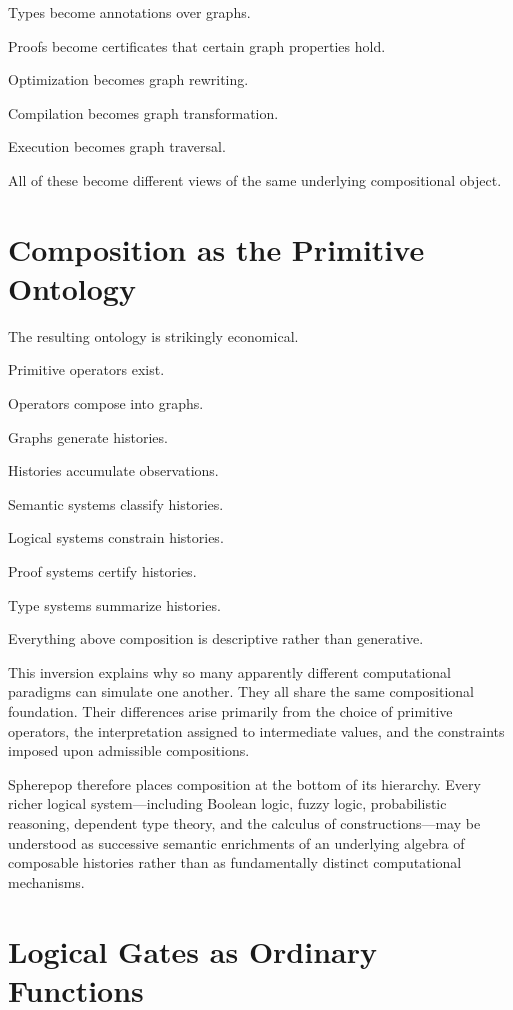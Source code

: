 \documentclass[12pt,oneside]{article}
\begin{document}
Types become annotations over graphs.

Proofs become certificates that certain graph properties hold.

Optimization becomes graph rewriting.

Compilation becomes graph transformation.

Execution becomes graph traversal.

All of these become different views of the same underlying compositional object.

\section{Composition as the Primitive Ontology}

The resulting ontology is strikingly economical.

Primitive operators exist.

Operators compose into graphs.

Graphs generate histories.

Histories accumulate observations.

Semantic systems classify histories.

Logical systems constrain histories.

Proof systems certify histories.

Type systems summarize histories.

Everything above composition is descriptive rather than generative.

This inversion explains why so many apparently different computational paradigms can simulate one another. They all share the same compositional foundation. Their differences arise primarily from the choice of primitive operators, the interpretation assigned to intermediate values, and the constraints imposed upon admissible compositions.

Spherepop therefore places composition at the bottom of its hierarchy. Every richer logical system—including Boolean logic, fuzzy logic, probabilistic reasoning, dependent type theory, and the calculus of constructions—may be understood as successive semantic enrichments of an underlying algebra of composable histories rather than as fundamentally distinct computational mechanisms.

\section{Logical Gates as Ordinary Functions}
\end{document}
